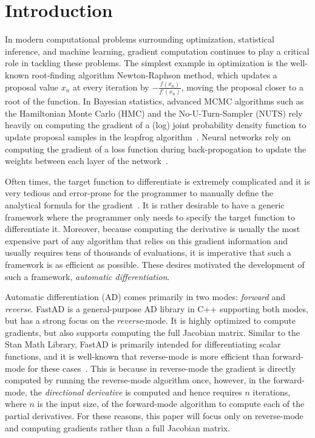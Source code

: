 \section{Introduction}

In modern computational problems surrounding optimization, statistical inference, and machine learning,
gradient computation continues to play a critical role in tackling these problems.
The simplest example in optimization is the well-known root-finding algorithm Newton-Raphson method,
which updates a proposal value $x_n$ at every iteration by $-\frac{f(x_n)}{f'(x_n)}$,
moving the proposal closer to a root of the function.
In Bayesian statistics, advanced MCMC algorithms
such as the Hamiltonian Monte Carlo (HMC) and the No-U-Turn-Sampler (NUTS) rely
heavily on computing the gradient of a (log) joint probability density function
to update proposal samples in the leapfrog algorithm~\cite{hoffman:2011}\cite{neal:2012}.
Neural networks rely on computing 
the gradient of a loss function during back-propogation
to update the weights between each layer of the network~\cite{goodfellow:2016}.

Often times, the target function to differentiate is extremely complicated
and it is very tedious and error-prone for the programmer to manually define 
the analytical formula for the gradient~\cite{margossian:2018}.
It is rather desirable to have a generic framework where the programmer 
only needs to specify the target function to differentiate it.
Moreover, because computing the derivative is usually the most expensive part of any algorithm
that relies on this gradient information and usually requires tens of thousands of evaluations, 
it is imperative that such a framework is as efficient as possible.
These desires motivated the development of such a framework, \emph{automatic differentiation}.

Automatic differentiation (AD) comes primarily in two modes: \emph{forward} and \emph{reverse}.
FastAD is a general-purpose AD library in C++ supporting both modes, but has a strong focus on the \emph{reverse}-mode.
It is highly optimized to compute gradients, but also supports computing the full Jacobian matrix.
Similar to the Stan Math Library, FastAD is primarily intended for differentiating scalar functions, 
and it is well-known that reverse-mode is more efficient than forward-mode for these cases~\cite{carpenter:2015}.
This is because in reverse-mode the gradient is directly computed by running the reverse-mode algorithm once,
however, in the forward-mode, the \emph{directional derivative} is computed and hence requires 
$n$ iterations, where $n$ is the input size, of the forward-mode algorithm to compute each of the partial derivatives.
For these reasons, this paper will focus only on reverse-mode and computing gradients rather than a full Jacobian matrix.
